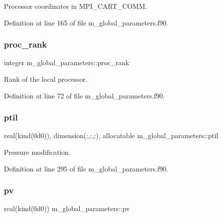 Processor coordinates in M\+P\+I\+\_\+\+C\+A\+R\+T\+\_\+\+C\+O\+MM. 



Definition at line 165 of file m\+\_\+global\+\_\+parameters.\+f90.

\mbox{\label{namespacem__global__parameters_a383c6ff025d4ea09ddd4e2356042d86b}} 
\subsubsection{\texorpdfstring{proc\+\_\+rank}{proc\_rank}}
{\footnotesize\ttfamily integer m\+\_\+global\+\_\+parameters\+::proc\+\_\+rank}



Rank of the local processor. 



Definition at line 72 of file m\+\_\+global\+\_\+parameters.\+f90.

\mbox{\label{namespacem__global__parameters_ac6ff480000eaa7af51481d0f17b78423}} 
\subsubsection{\texorpdfstring{ptil}{ptil}}
{\footnotesize\ttfamily real(kind(0d0)), dimension(\+:,\+:,\+:), allocatable m\+\_\+global\+\_\+parameters\+::ptil}



Pressure modification. 



Definition at line 295 of file m\+\_\+global\+\_\+parameters.\+f90.

\mbox{\label{namespacem__global__parameters_acc5b8b153cee23d65a886df38f821f08}} 
\subsubsection{\texorpdfstring{pv}{pv}}
{\footnotesize\ttfamily real(kind(0d0)) m\+\_\+global\+\_\+parameters\+::pv}



